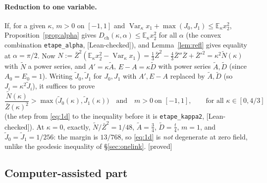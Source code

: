 \documentclass[11pt,a4paper]{article}
\theoremstyle{remark}
\theoremstyle{definition}
\theoremstyle{plain}
\theoremstyle{remark}
\newcommand{\E}{\mathbb{E}}
\newcommand{\Var}{\operatorname{Var}}
\newcommand{\st}[1]{\textsf{[#1]}}
\newcommand{\Zb}{\bar Z}
\newcommand{\Dch}{D_{\mathrm{ch}}}
\begin{document}
\paragraph{Reduction to one variable.} If, for a given $\kappa$, $m>0$ on $[-1,1]$ and
$\Var_\kappa x_1+\max(J_0,J_1)\le\E_\kappa x_2^2$, Proposition~\ref{prop:alpha} gives $\Dch(\kappa,\alpha)\le\E_\kappa x_2^2$
for all $\alpha$ (the convex combination \texttt{etape\_alpha}, \st{Lean-checked}), and Lemma~\ref{lem:refl} gives
equality at $\alpha=\pi/2$. Now $N:=\Zb^2(\E_\kappa x_2^2-\Var_\kappa x_1)=\frac13\Zb^2-\frac43\Zb''\Zb+\Zb'^2=\kappa^2\tilde N(\kappa)$ with
$\tilde N$ a power series, and $A'=\kappa\tilde A$, $E-A=\kappa\tilde D$ with power series $\tilde A,\tilde D$ (since
$A_0=E_0=1$). Writing $\tilde J_0,\tilde J_1$ for $J_0,J_1$ with $A',E-A$ replaced by $\tilde A,\tilde D$ (so
$J_i=\kappa^2\tilde J_i$), it suffices to prove
\begin{equation}\label{eq:1d}
\frac{\tilde N(\kappa)}{\Zb(\kappa)^2}>\max\big(\tilde J_0(\kappa),\tilde J_1(\kappa)\big)\quad\text{and}\quad m>0\ \text{on }[-1,1],
\qquad\text{for all }\kappa\in[0,4/3]
\end{equation}
(the step from \eqref{eq:1d} to the inequality before it is \texttt{etape\_kappa2}, \st{Lean-checked}). At $\kappa=0$,
exactly, $\tilde N/\Zb^2=1/48$, $\tilde A=\frac34$, $\tilde D=\frac t4$, $m=1$, and $\tilde J_0=\tilde J_1=1/256$: the
margin is $13/768$, so \eqref{eq:1d} is \emph{not} degenerate at zero field, unlike the geodesic inequality of
\S\ref{sec:onelink}. \st{proved}


\subsection{Computer-assisted part}\label{sec:chcap}
\end{document}
